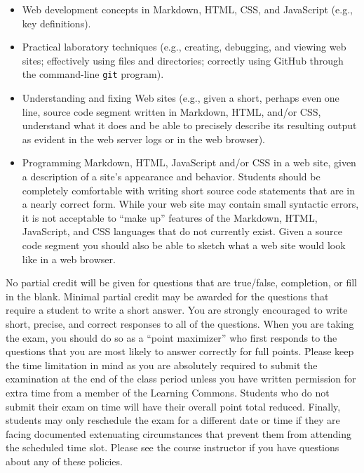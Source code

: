 \documentclass[11pt]{article}
\begin{document}
\vspace*{-.05in}
\begin{itemize}

  \itemsep 0in

  \item Web development concepts in Markdown, HTML, CSS, and JavaScript (e.g.,
    key definitions).

  \item Practical laboratory techniques (e.g., creating, debugging, and viewing
    web sites; effectively using files and directories; correctly using GitHub
    through the command-line {\tt git} program).

  \item Understanding and fixing Web sites (e.g., given a short, perhaps even
    one line, source code segment written in Markdown, HTML, and/or CSS,
    understand what it does and be able to precisely describe its resulting
    output as evident in the web server logs or in the web browser).

  \item Programming Markdown, HTML, JavaScript and/or CSS in a web site, given a
    description of a site's appearance and behavior. Students should be
    completely comfortable with writing short source code statements that are in
    a nearly correct form. While your web site may contain small syntactic
    errors, it is not acceptable to ``make up'' features of the Markdown, HTML,
    JavaScript, and CSS languages that do not currently exist. Given a source
    code segment you should also be able to sketch what a web site would look
    like in a web browser.

\end{itemize}

\noindent No partial credit will be given for questions that are true/false,
completion, or fill in the blank. Minimal partial credit may be awarded for the
questions that require a student to write a short answer. You are strongly
encouraged to write short, precise, and correct responses to all of the
questions. When you are taking the exam, you should do so as a ``point
maximizer'' who first responds to the questions that you are most likely to
answer correctly for full points. Please keep the time limitation in mind as you
are absolutely required to submit the examination at the end of the class period
unless you have written permission for extra time from a member of the Learning
Commons. Students who do not submit their exam on time will have their overall
point total reduced. Finally, students may only reschedule the exam for a
different date or time if they are facing documented extenuating circumstances
that prevent them from attending the scheduled time slot. Please see the course
instructor if you have questions about any of these policies.
\end{document}
